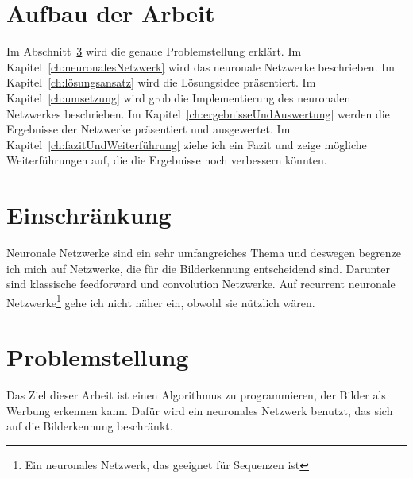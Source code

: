 \documentclass[12pt,a4paper]{report}
\begin{document}
\section{Aufbau der Arbeit}
\label{sec:aufbauDerArbeit}
Im Abschnitt~\ref{sec:problemstellung} wird die genaue Problemstellung erklärt.
Im Kapitel~\ref{ch:neuronalesNetzwerk} wird das neuronale Netzwerke beschrieben.
Im Kapitel~\ref{ch:lösungsansatz} wird die Lösungsidee präsentiert.
Im Kapitel~\ref{ch:umsetzung} wird grob die Implementierung des neuronalen Netzwerkes beschrieben.
Im Kapitel~\ref{ch:ergebnisseUndAuswertung} werden die Ergebnisse der Netzwerke präsentiert und ausgewertet.
Im Kapitel~\ref{ch:fazitUndWeiterführung} ziehe ich ein Fazit und zeige mögliche Weiterführungen auf, die die Ergebnisse noch verbessern könnten.

\section{Einschränkung}
Neuronale Netzwerke sind ein sehr umfangreiches Thema und deswegen begrenze ich mich auf Netzwerke, die für die Bilderkennung entscheidend sind.
Darunter sind klassische feedforward und convolution Netzwerke.
Auf recurrent neuronale Netzwerke\footnote{Ein neuronales Netzwerk, das geeignet für Sequenzen ist\cite{wiki:rnn}} gehe ich nicht näher ein,
obwohl sie nützlich wären.

\section{Problemstellung}\label{sec:problemstellung}
Das Ziel dieser Arbeit ist einen Algorithmus zu programmieren, der Bilder als Werbung erkennen kann.
Dafür wird ein neuronales Netzwerk benutzt, das sich auf die Bilderkennung beschränkt.
\end{document}
